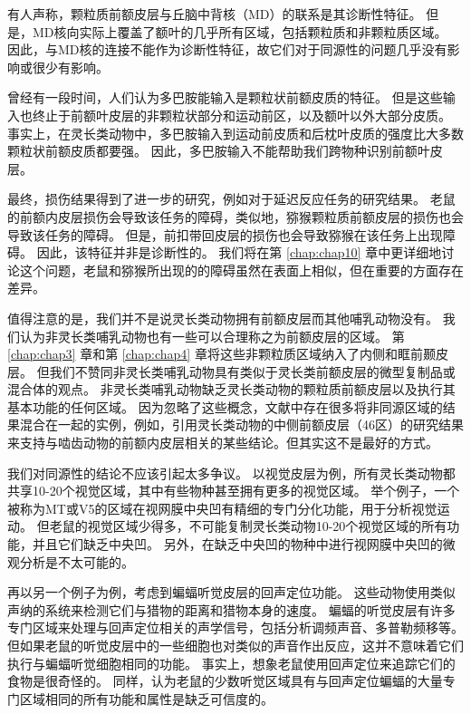 有人声称，颗粒质前额皮层与丘脑中背核（MD）的联系是其诊断性特征\cite{je1948orbitofrontal,akert1964comparative,uylings2003rats}。
但是，MD核向实际上覆盖了额叶的几乎所有区域，包括颗粒质和非颗粒质区域。
因此，与MD核的连接不能作为诊断性特征，故它们对于同源性的问题几乎没有影响或很少有影响。


曾经有一段时间，人们认为多巴胺能输入是颗粒状前额皮质的特征\cite{divac1978converging,porrino1982brainstem}。
但是这些输入也终止于前额叶皮层的非颗粒状部分和运动前区，以及额叶以外大部分皮质。
事实上，在灵长类动物中，多巴胺输入到运动前皮质和后枕叶皮质的强度比大多数颗粒状前额皮质都要强\cite{gaspar1992topography,williams1998widespread}。
因此，多巴胺输入不能帮助我们跨物种识别前额叶皮层。


最终，损伤结果得到了进一步的研究，例如对于延迟反应任务的研究结果。
老鼠的前额内皮层损伤会导致该任务的障碍\cite{kolb1974double}，类似地，猕猴颗粒质前额皮层的损伤也会导致该任务的障碍\cite{goldman1971analysis}。
但是，前扣带回皮层的损伤也会导致猕猴在该任务上出现障碍\cite{meunier1997effects}。
因此，该特征并非是诊断性的。
我们将在第 \ref{chap:chap10} 章中更详细地讨论这个问题，老鼠和猕猴所出现的的障碍虽然在表面上相似，但在重要的方面存在差异。


值得注意的是，我们并不是说灵长类动物拥有前额皮层而其他哺乳动物没有。
我们认为非灵长类哺乳动物也有一些可以合理称之为前额皮层的区域。
第 \ref{chap:chap3} 章和第 \ref{chap:chap4} 章将这些非颗粒质区域纳入了内侧和眶前颞皮层。
但我们不赞同非灵长类哺乳动物具有类似于灵长类前额皮层的微型复制品或混合体的观点。
非灵长类哺乳动物缺乏灵长类动物的颗粒质前额皮层以及执行其基本功能的任何区域。
因为忽略了这些概念，文献中存在很多将非同源区域的结果混合在一起的实例，例如，引用灵长类动物的中侧前额皮层（46区）的研究结果来支持与啮齿动物的前额内皮层相关的某些结论。但其实这不是最好的方式。


我们对同源性的结论不应该引起太多争议。
以视觉皮层为例，所有灵长类动物都共享10-20个视觉区域，其中有些物种甚至拥有更多的视觉区域\cite{kaas2020evolution}。
举个例子，一个被称为MT或V5的区域在视网膜中央凹有精细的专门分化功能，用于分析视觉运动。
但老鼠的视觉区域少得多\cite{rosa1999evolution,lyon200734}，不可能复制灵长类动物10-20个视觉区域的所有功能，并且它们缺乏中央凹。
另外，在缺乏中央凹的物种中进行视网膜中央凹的微观分析是不太可能的。


再以另一个例子为例，考虑到蝙蝠听觉皮层的回声定位功能。
这些动物使用类似声纳的系统来检测它们与猎物的距离和猎物本身的速度。
蝙蝠的听觉皮层有许多专门区域来处理与回声定位相关的声学信号，包括分析调频声音、多普勒频移等\cite{suga1997cortical,fitzpatrick1998distribution}。
但如果老鼠的听觉皮层中的一些细胞也对类似的声音作出反应，这并不意味着它们执行与蝙蝠听觉细胞相同的功能。
事实上，想象老鼠使用回声定位来追踪它们的食物是很奇怪的。
同样，认为老鼠的少数听觉区域具有与回声定位蝙蝠的大量专门区域相同的所有功能和属性是缺乏可信度的。


